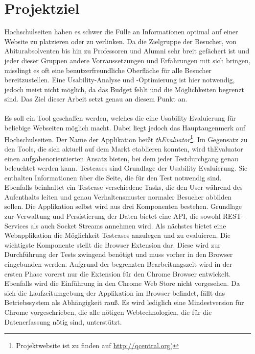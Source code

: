 %
%
%
%

\section{Projektziel}

Hochschulseiten haben es schwer die Fülle an Informationen optimal auf einer Website zu platzieren oder zu verlinken. Da die Zielgruppe der Besucher, von Abiturabsolventen bis hin zu Professoren und Alumni sehr breit gefächert ist und jeder dieser Gruppen andere Vorraussetzungen und Erfahrungen mit sich bringen, misslingt es oft eine benutzerfreundliche Oberfläche für alle Besucher bereitzustellen. Eine Usability-Analyse und -Optimierung ist hier notwendig, jedoch meist nicht möglich, da das Budget fehlt und die Möglichkeiten begrenzt sind. Das Ziel dieser Arbeit setzt genau an diesem Punkt an.\\
\\
Es soll ein Tool geschaffen werden, welches die eine Usability Evaluierung für beliebige Webseiten möglich macht. Dabei liegt jedoch das Hauptaugenmerk auf Hochschulseiten. Der Name der Applikation heißt \textit{thEvaluator}\footnote{Projektwebsite ist zu finden auf \url{http://qcentral.org})}. Im Gegensatz zu den Tools, die sich aktuell auf dem Markt etablieren konnten, wird thEvaluator einen aufgabenorientierten Ansatz bieten, bei dem jeder Testdurchgang genau beleuchtet werden kann. Testcases sind Grundlage der Usability Evaluierung. Sie enthalten Informationen über die Seite, die für den Test notwendig sind. Ebenfalls beinhaltet ein Testcase verschiedene  Tasks, die den User während des Aufenthalts leiten und genau Verhaltensmuster normaler Besucher abbilden sollen. Die Applikation selbst wird aus drei Komponenten bestehen. Grundlage zur Verwaltung und Persistierung der Daten bietet eine API, die sowohl REST-Services als auch Socket Streams annehmen wird. Als nächstes bietet eine Webapplikation die Möglichkeit Testcases anzulegen und zu evaluieren. Die wichtigste Komponente stellt die Browser Extension dar. Diese wird zur Durchführung der Tests zwingend benötigt und muss vorher in den Browser eingebunden werden. Aufgrund der begrenzten Bearbeitungszeit wird in der ersten Phase vorerst nur die Extension für den Chrome Browser entwickelt. Ebenfalls wird die Einführung in den Chrome Web Store nicht vorgesehen. Da sich die Laufzeitumgebung der Applikation im Browser befindet, fällt das Betriebssystem als Abhängigkeit rauß. Es wird lediglich eine Mindestversion für Chrome vorgeschrieben, die alle nötigen Webtechnologien, die für die Datenerfassung nötig sind, unterstützt.\\
